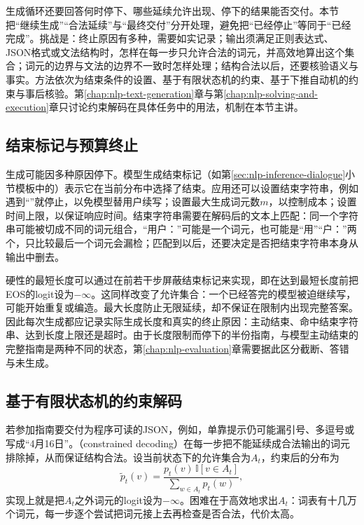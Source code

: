 生成循环还要回答何时停下、哪些延续允许出现、停下的结果能否交付。本节把“继续生成”“合法延续”与“最终交付”分开处理，避免把“已经停止”等同于“已经完成”。挑战是：终止原因有多种，需要如实记录；输出须满足正则表达式、JSON格式或文法结构时，怎样在每一步只允许合法的词元，并高效地算出这个集合；词元的边界与文法的边界不一致时怎样处理；结构合法以后，还要核验语义与事实。方法依次为结束条件的设置、基于有限状态机的约束、基于下推自动机的约束与事后核验。第\ref{chap:nlp-text-generation}章与第\ref{chap:nlp-solving-and-execution}章只讨论约束解码在具体任务中的用法，机制在本节主讲。

\subsection{结束标记与预算终止}
\label{sec:nlp-inference-stop}

生成可能因多种原因停下。模型生成结束标记（如第\ref{sec:nlp-inference-dialogue}小节模板中的）表示它在当前分布中选择了结束。应用还可以设置结束字符串，例如遇到“”就停止，以免模型替用户续写；设置最大生成词元数$m$，以控制成本；设置时间上限，以保证响应时间。结束字符串需要在解码后的文本上匹配：同一个字符串可能被切成不同的词元组合，“用户：”可能是一个词元，也可能是“用”“户：”两个，只比较最后一个词元会漏检；匹配到以后，还要决定是否把结束字符串本身从输出中删去。

硬性的最短长度可以通过在前若干步屏蔽结束标记来实现，即在达到最短长度前把EOS的logit设为$-\infty$。这同样改变了允许集合：一个已经答完的模型被迫继续写，可能开始重复或编造。最大长度防止无限延续，却不保证在限制内出现完整答案。因此每次生成都应记录实际生成长度和真实的终止原因：主动结束、命中结束字符串、达到长度上限还是超时。由于长度限制而停下的半份指南，与模型主动结束的完整指南是两种不同的状态，第\ref{chap:nlp-evaluation}章需要据此区分截断、答错与未生成。

\subsection{基于有限状态机的约束解码}
\label{sec:nlp-inference-fsm}

若参加指南要交付为程序可读的JSON，例如，单靠提示仍可能漏引号、多逗号或写成“4月16日”。（constrained decoding）在每一步把不能延续成合法输出的词元排除掉，从而保证结构合法。设当前状态下的允许集合为$A_t$，约束后的分布为
\begin{equation}
 \tilde p_t(v)=\frac{p_t(v)\,\mathbb I[v\in A_t]}{\sum_{w\in A_t}p_t(w)},
 \label{eq:nlp-inference-constrained}
\end{equation}
实现上就是把$A_t$之外词元的logit设为$-\infty$。困难在于高效地求出$A_t$：词表有十几万个词元，每一步逐个尝试把词元接上去再检查是否合法，代价太高。

